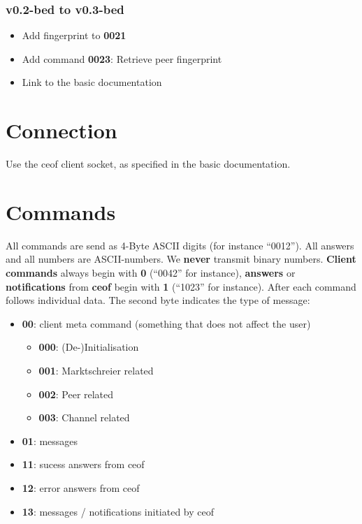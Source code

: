 \documentclass[12pt,a4paper]{book}
\begin{document}
\subsubsection{v0.2-bed to v0.3-bed}
\begin{itemize}
\item Add fingerprint to \textbf{0021}
\item Add command \textbf{0023}: Retrieve peer fingerprint
\item Link to the basic documentation
\end{itemize}
\section{Connection}
Use the ceof client socket, as specified in the basic documentation.
\section{Commands}
All commands are send as 4-Byte ASCII digits (for instance "`0012"').
All answers and all numbers are ASCII-numbers. We
\textbf{never} transmit binary numbers.
\textbf{Client commands} always begin with \textbf{0} ("`0042"' for instance),
\textbf{answers} or \textbf{notifications} from
\textbf{ceof} begin with \textbf{1} ("`1023"' for instance).
After each command follows individual data. The second byte indicates the type of message:
\begin{itemize}
\item \textbf{00}: client meta command (something that does not affect the user)
\begin{itemize}
\item \textbf{000}: (De-)Initialisation
\item \textbf{001}: Marktschreier related
\item \textbf{002}: Peer related
\item \textbf{003}: Channel related
\end{itemize}
\item \textbf{01}: messages
\item \textbf{11}: sucess answers from ceof
\item \textbf{12}: error answers from ceof
\item \textbf{13}: messages / notifications initiated by ceof
\end{itemize}
\end{document}
